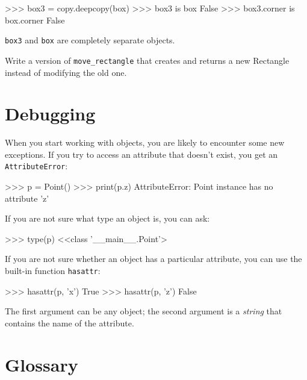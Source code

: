 
\beforeverb
\begin{pyinterpreter}
>>> box3 = copy.deepcopy(box)
>>> box3 is box
False
>>> box3.corner is box.corner
False
\end{pyinterpreter}
\afterverb
%
{\tt box3} and {\tt box} are completely separate objects.


\begin{exercise}
Write a version of \verb"move_rectangle" that creates and
returns a new Rectangle instead of modifying the old one.
\end{exercise}


\section{Debugging}
\label{hasattr}


When you start working with objects, you are likely to encounter
some new exceptions.  If you try to access an attribute
that doesn't exist, you get an {\tt AttributeError}:


\beforeverb
\begin{pyinterpreter}
>>> p = Point()
>>> print(p.z)
AttributeError: Point instance has no attribute 'z'
\end{pyinterpreter}
\afterverb
%
If you are not sure what type an object is, you can ask:


\beforeverb
\begin{pyinterpreter}
>>> type(p)
<<class '__main__.Point'>
\end{pyinterpreter}
\afterverb
%
If you are not sure whether an object has a particular attribute,
you can use the built-in function {\tt hasattr}:


\beforeverb
\begin{pyinterpreter}
>>> hasattr(p, 'x')
True
>>> hasattr(p, 'z')
False
\end{pyinterpreter}
\afterverb
%
The first argument can be any object; the second argument is a {\em
string} that contains the name of the attribute.


\section{Glossary}
	
